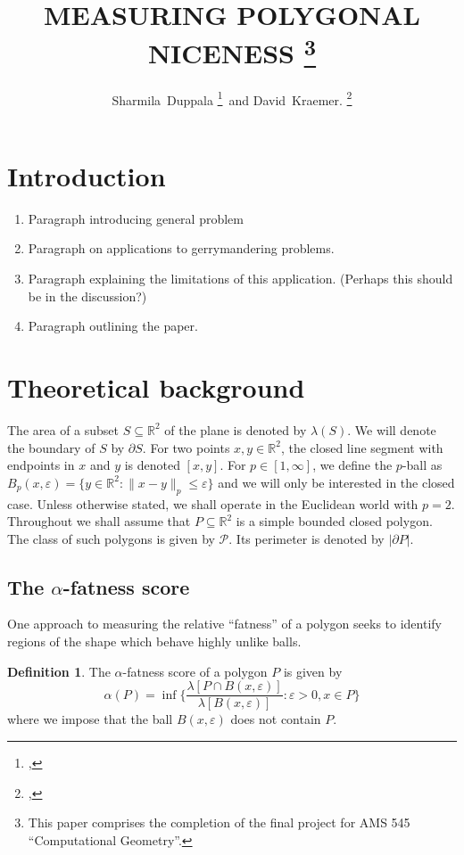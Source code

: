 \documentclass[]{jocg}
\title{%
  \MakeUppercase{Measuring polygonal niceness}%
  \thanks{%
    This paper comprises the completion of the final project for AMS 545
    ``Computational Geometry''.
  }
}
\author{%
  Sharmila~Duppala%
  \thanks{%
    \affil{Department of Computer Science}, 
    \email{sduppala@cs.stonybrook.edu}%
  }\, and
  David~Kraemer.%
  \thanks{%
    \affil{Department of Applied Mathematics},
    \email{david.kraemer@stonybrook.edu}%
  }
}
\newcommand{\RR}{\mathbb{R}}
\newcommand{\PP}{\mathcal{P}}
\newcommand{\set}[1]{\{#1\}}
\newcommand{\norm}[1]{\|#1\|}
\newcommand{\abs}[1]{|#1|}
\theoremstyle{definition}
\newtheorem{definition}[proposition]{Definition}
\theoremstyle{remark}
\begin{document}
\maketitle

\begin{abstract}
\end{abstract}

\tableofcontents

\section{Introduction}

\begin{enumerate}
  \item Paragraph introducing general problem
  \item Paragraph on applications to gerrymandering problems.
  \item Paragraph explaining the limitations of this application. (Perhaps this
    should be in the discussion?)
  \item Paragraph outlining the paper.
\end{enumerate}

\section{Theoretical background}

The area of a subset $S \subseteq \RR^2$ of the plane is denoted by
$\lambda(S)$. We will denote the boundary of $S$ by $\partial S$. For two points
$x,y \in \RR^2$, the closed line segment with endpoints in $x$ and $y$ is
denoted $[x,y]$. For $p \in [1, \infty]$, we define the $p$-ball as $B_{p}(x,
\varepsilon) = \set{y \in \RR^2 : \norm{x-y}_p \leq \varepsilon}$ and we will
only be interested in the closed case. Unless otherwise stated, we shall operate
in the Euclidean world with $p = 2$. Throughout we shall assume that $P
\subseteq \RR^2$ is a simple bounded closed polygon. The class of such polygons
is given by $\PP$. Its perimeter is denoted by $\abs{\partial P}$.

\subsection{The $\alpha$-fatness score}

One approach to measuring the relative ``fatness'' of a polygon seeks to
identify regions of the shape which behave highly unlike balls.

\begin{definition}
  The $\alpha$-fatness score of a polygon $P$ is given by
  \begin{equation*}
    \alpha(P) = \inf\set{\frac{\lambda[P \cap B(x,
    \varepsilon)]}{\lambda[B(x,\varepsilon)]} : \varepsilon > 0, x \in P}
  \end{equation*}
  where we impose that the ball $B(x,\varepsilon)$
  does not contain $P$. 
  \label{def:alpha}
\end{definition}
\end{document}

